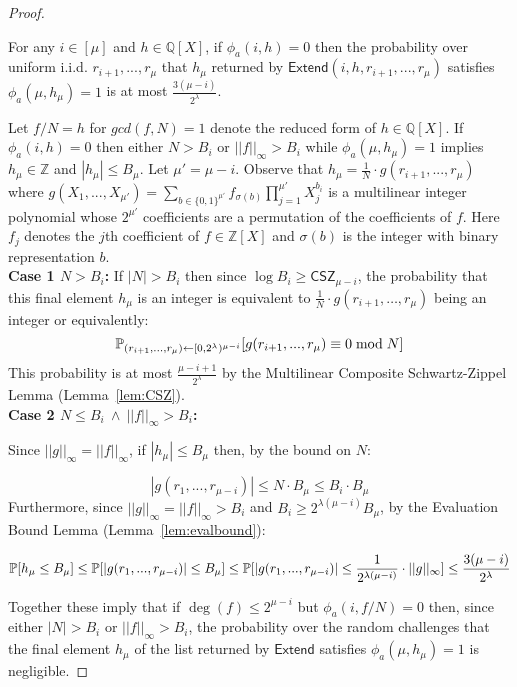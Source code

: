 \begin{proof}
\begin{subclaim} 
For any $i \in [\mu]$ and $h \in \mathbb{Q}[X]$, if $\phi_a(i, h) = 0$ then the probability over uniform i.i.d. $r_{i+1},...,r_\mu$ that $h_\mu$ returned by $\textsf{Extend}(i,h, r_{i+1},...,r_\mu)$ satisfies $\phi_a(\mu, h_\mu) = 1$ is at most $\frac{3(\mu - i)}{2^\lambda}$. 
\end{subclaim} 

Let $f/N = h$ for $gcd(f, N) = 1$ denote the reduced form of $h \in \mathbb{Q}[X]$. If $\phi_a(i,h) = 0$ then either $N > B_i$ or $||f||_\infty > B_i$ while $\phi_a(\mu, h_\mu) = 1$ implies $h_\mu \in \mathbb{Z}$ and $|h_\mu| \leq B_\mu$.
 Let $\mu' = \mu - i$. Observe that $h_\mu = \frac{1}{N} \cdot g(r_{i+1},...,r_\mu)$ where $g(X_1,...,X_{\mu'}) = \sum_{b \in \{0,1\}^{\mu'}} f_{\sigma(b)} \prod_{j=1}^{\mu'}X_j^{b_i}$ is a multilinear integer polynomial whose $2^{\mu'}$ coefficients are a permutation of the coefficients of $f$. Here $f_j$ denotes the $j$th coefficient of $f \in \mathbb{Z}[X]$ and $\sigma(b)$ is the integer with binary representation $b$. \\
 
 \noindent \textbf{Case 1 $N > B_i$:} If $|N| > B_i$ then since $\log B_i \geq \mathsf{CSZ}_{\mu - i}$, the probability that this final element $h_\mu$ is an integer is equivalent to $\frac{1}{N} \cdot g(r_{i+1},\dots,r_\mu)$ being an integer or equivalently: 
 $$\mathbb{P}_{(r_{i+1},...,r_\mu) \gets [0,2^\lambda)^{\mu -i}} [g(r_{i+1},...,r_\mu)\equiv 0 \bmod N] $$
This probability is at most $\frac{\mu - i +1}{2^\lambda}$ by the Multilinear Composite Schwartz-Zippel Lemma (Lemma~\ref{lem:CSZ}).\\

 
\noindent \textbf{Case 2 $N \leq B_i \ \wedge \ ||f||_\infty > B_i$:} 
 
 Since $||g||_\infty = ||f||_\infty$, if $|h_\mu| \leq B_\mu$ then, by the bound on $N$: 
  
 $$|g(r_1,...,r_{\mu-i})| \leq N \cdot B_\mu \leq B_i \cdot B_\mu$$
 Furthermore, since $||g||_\infty = ||f||_\infty > B_i$ and $B_i \geq 2^{\lambda(\mu - i)} B_\mu$, by the Evaluation Bound Lemma (Lemma~\ref{lem:evalbound}): 

$$\mathbb{P}[h_\mu \leq B_\mu] \leq \mathbb{P}[|g(r_1,...,r_{\mu-i})| \leq B_\mu] \leq \mathbb{P}[|g(r_1,...,r_{\mu-i})| \leq \frac{1}{2^{\lambda (\mu - i)}} \cdot ||g||_\infty] \leq  \frac{3(\mu- i)}{2^{\lambda}}$$

 
Together these imply that if $\deg(f) \leq 2^{\mu -i}$ but $\phi_a(i, f/N) = 0$ then, since either $|N| > B_i$ or $||f||_\infty > B_i$, the probability over the random challenges that the final element $h_\mu$ of the list returned by $\textsf{Extend}$ satisfies $\phi_a(\mu, h_\mu) = 1$ is negligible. 

\end{proof} 


